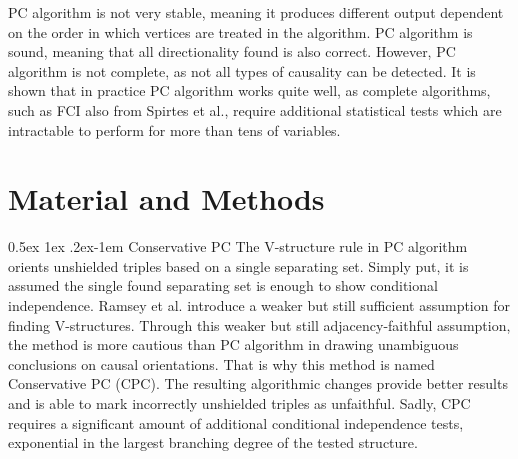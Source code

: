 \documentclass[a4paper, 10pt, english, onecolumn]{article}
\makeatletter
\renewcommand{\paragraph}{%
  \@startsection{paragraph}{4}%
  {\z@}{0.5ex \@plus 1ex \@minus .2ex}{-1em}%
  {\normalfont\normalsize\bfseries}%
}
\makeatother
\begin{document}
PC algorithm is not very stable, meaning it produces different output dependent on the order in which vertices are treated in the algorithm.
PC algorithm is sound, meaning that all directionality found is also correct.
However, PC algorithm is not complete, as not all types of causality can be detected.
It is shown that in practice PC algorithm works quite well, as complete algorithms, such as FCI also from Spirtes et al., require additional statistical tests which are intractable to perform for more than tens of variables.

\section{Material and Methods}


\paragraph{Conservative PC}
The V-structure rule in PC algorithm orients unshielded triples based on a single separating set. 
Simply put, it is assumed the single found separating set is enough to show conditional independence. 
Ramsey et al. \cite{ramsey2012} introduce a weaker but still sufficient assumption for finding V-structures.
Through this weaker but still adjacency-faithful assumption, the method is more cautious than PC algorithm in drawing unambiguous conclusions on causal orientations.
That is why this method is named Conservative PC (CPC).
The resulting algorithmic changes provide better results and is able to mark incorrectly unshielded triples as unfaithful.
Sadly, CPC requires a significant amount of additional conditional independence tests, exponential in the largest branching degree of the tested structure.
\end{document}
